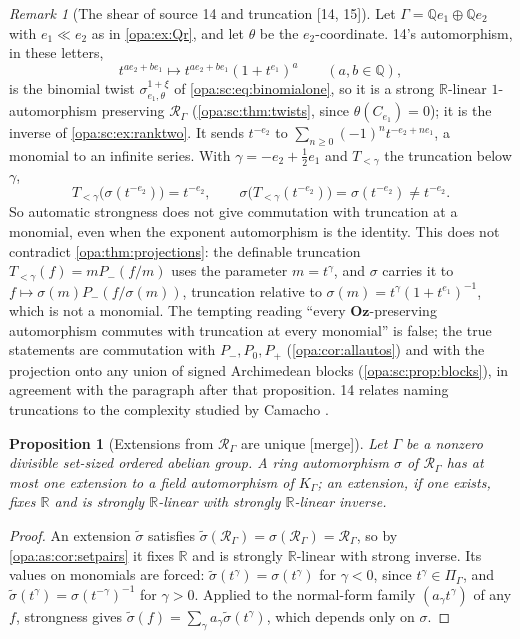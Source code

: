 \documentclass[11pt,oneside]{article}
\numberwithin{equation}{section}
\newtheorem{proposition}[proposition]{Proposition}
\theoremstyle{definition}
\theoremstyle{remark}
\newtheorem{remark}[remark]{Remark}
\newcommand{\Oz}{\mathbf{Oz}}
\newcommand{\R}{\mathbb R}
\newcommand{\Q}{\mathbb Q}
\newcommand{\bb}{\mathbin{\ll}}
\newcommand{\src}[1]{\textup{\textsf{\small[#1]}}}
\newcommand{\mergetag}{\textup{\textsf{\small[merge]}}}
\begin{document}
\begin{remark}[The shear of source 14 and truncation \src{14, 15}]\label{opa:cm:rem:shear}
Let $\Gamma=\Q e_1\oplus\Q e_2$ with $e_1\bb e_2$ as in \cref{opa:ex:Qr}, and let $\theta$ be the
$e_2$-coordinate. 14's automorphism, in these letters,
\[
 t^{ae_2+be_1}\longmapsto t^{ae_2+be_1}(1+t^{e_1})^a\qquad(a,b\in\Q),
\]
is the binomial twist $\sigma^{1+\xi}_{e_1,\theta}$ of \eqref{opa:sc:eq:binomialone}, so it is a strong
$\R$-linear $1$-automorphism preserving $\mathcal R_\Gamma$ (\cref{opa:sc:thm:twists}, since
$\theta(C_{e_1})=0$); it is the inverse of \cref{opa:sc:ex:ranktwo}. It sends $t^{-e_2}$ to
$\sum_{n\ge0}(-1)^nt^{-e_2+ne_1}$, a monomial to an infinite series. With $\gamma=-e_2+\frac12e_1$
and $T_{<\gamma}$ the truncation below $\gamma$,
\[
 T_{<\gamma}\bigl(\sigma(t^{-e_2})\bigr)=t^{-e_2},\qquad
 \sigma\bigl(T_{<\gamma}(t^{-e_2})\bigr)=\sigma(t^{-e_2})\ne t^{-e_2}.
\]
So automatic strongness does not give commutation with truncation at a monomial, even when
the exponent automorphism is the identity. This does not contradict \cref{opa:thm:projections}:
the definable truncation $T_{<\gamma}(f)=mP_-(f/m)$ uses the parameter $m=t^\gamma$, and
$\sigma$ carries it to $f\mapsto\sigma(m)P_-(f/\sigma(m))$, truncation relative to
$\sigma(m)=t^\gamma(1+t^{e_1})^{-1}$, which is not a monomial. The tempting reading ``every
$\Oz$-preserving automorphism commutes with truncation at every monomial'' is false; the true
statements are commutation with $P_-,P_0,P_+$ (\cref{opa:cor:allautos}) and with the
projection onto any union of signed Archimedean blocks (\cref{opa:sc:prop:blocks}), in
agreement with the paragraph after that proposition. 14 relates naming truncations to the
complexity studied by Camacho \cite{Camacho}.
\end{remark}

\begin{proposition}[Extensions from $\mathcal R_\Gamma$ are unique \mergetag]\label{opa:cm:prop:unique}
Let $\Gamma$ be a nonzero divisible set-sized ordered abelian group. A ring automorphism $\sigma$ of
$\mathcal R_\Gamma$ has at most one extension to a field automorphism of $K_\Gamma$; an extension,
if one exists, fixes $\R$ and is strongly $\R$-linear with strongly $\R$-linear inverse.
\end{proposition}
\begin{proof}
An extension $\widetilde\sigma$ satisfies $\widetilde\sigma(\mathcal R_\Gamma)=\sigma(\mathcal R_\Gamma)=\mathcal R_\Gamma$,
so by \cref{opa:as:cor:setpairs} it fixes $\R$ and is strongly $\R$-linear with strong inverse. Its
values on monomials are forced: $\widetilde\sigma(t^\gamma)=\sigma(t^\gamma)$ for $\gamma<0$, since
$t^\gamma\in\Pi_\Gamma$, and $\widetilde\sigma(t^\gamma)=\sigma(t^{-\gamma})^{-1}$ for $\gamma>0$. Applied to
the normal-form family $(a_\gamma t^\gamma)$ of any $f$, strongness gives
$\widetilde\sigma(f)=\sum_\gamma a_\gamma\widetilde\sigma(t^\gamma)$, which depends only on $\sigma$.
\end{proof}
\end{document}
